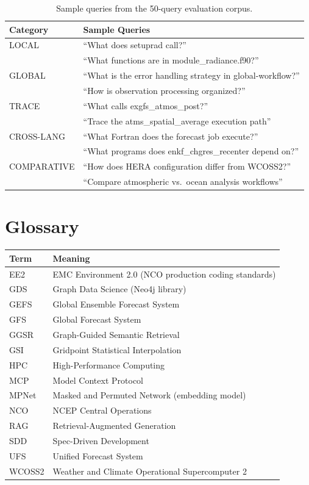 \documentclass[11pt,letterpaper]{article}
\begin{document}
\begin{table}[H]
\centering
\caption{Sample queries from the 50-query evaluation corpus.}
\small
\begin{tabular}{@{}lp{7.5cm}@{}}
\toprule
\textbf{Category} & \textbf{Sample Queries} \\
\midrule
LOCAL & ``What does setuprad call?''\\
      & ``What functions are in module\_radiance.f90?'' \\
\midrule
GLOBAL & ``What is the error handling strategy in global-workflow?''\\
       & ``How is observation processing organized?'' \\
\midrule
TRACE & ``What calls exgfs\_atmos\_post?''\\
      & ``Trace the atms\_spatial\_average execution path'' \\
\midrule
CROSS-LANG & ``What Fortran does the forecast job execute?''\\
           & ``What programs does enkf\_chgres\_recenter depend on?'' \\
\midrule
COMPARATIVE & ``How does HERA configuration differ from WCOSS2?''\\
            & ``Compare atmospheric vs.\ ocean analysis workflows'' \\
\bottomrule
\end{tabular}
\end{table}

\section{Glossary}
\label{app:glossary}

\begin{table}[H]
\centering
\small
\begin{tabular}{@{}ll@{}}
\toprule
\textbf{Term} & \textbf{Meaning} \\
\midrule
EE2   & EMC Environment 2.0 (NCO production coding standards) \\
GDS   & Graph Data Science (Neo4j library) \\
GEFS  & Global Ensemble Forecast System \\
GFS   & Global Forecast System \\
GGSR  & Graph-Guided Semantic Retrieval \\
GSI   & Gridpoint Statistical Interpolation \\
HPC   & High-Performance Computing \\
MCP   & Model Context Protocol \\
MPNet & Masked and Permuted Network (embedding model) \\
NCO   & NCEP Central Operations \\
RAG   & Retrieval-Augmented Generation \\
SDD   & Spec-Driven Development \\
UFS   & Unified Forecast System \\
WCOSS2 & Weather and Climate Operational Supercomputer 2 \\
\bottomrule
\end{tabular}
\end{table}
\end{document}
